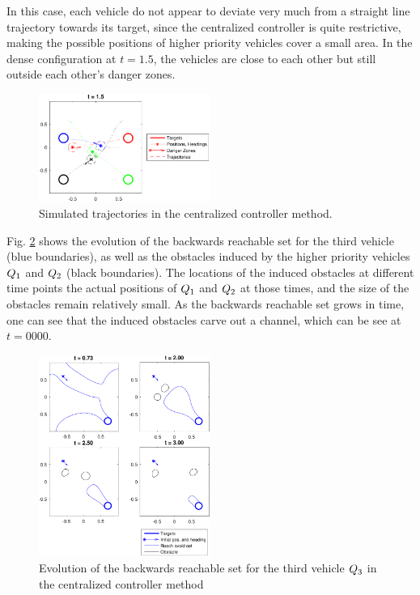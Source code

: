 In this case, each vehicle do not appear to deviate very much from a straight line trajectory towards its target, since the centralized controller is quite restrictive, making the possible positions of higher priority vehicles cover a small area. In the dense configuration at $t=1.5$, the vehicles are close to each other but still outside each other's danger zones.

\begin{figure}
  \centering
  \includegraphics[width=0.5\textwidth]{"fig/cc_traj"}
  \caption{Simulated trajectories in the centralized controller method.}
  \label{fig:cc_traj}
\end{figure}

Fig. \ref{fig:cc_rs3} shows the evolution of the backwards reachable set for the third vehicle (blue boundaries), as well as the obstacles induced by the higher priority vehicles $Q_1$ and $Q_2$ (black boundaries). The locations of the induced obstacles at different time points the actual positions of $Q_1$ and $Q_2$ at those times, and the size of the obstacles remain relatively small. As the backwards reachable set grows in time, one can see that the induced obstacles carve out a channel, which can be see at $t = 0000$.

\begin{figure}
  \centering
  \includegraphics[width=0.5\textwidth]{"fig/cc_rs3"}
  \caption{Evolution of the backwards reachable set for the third vehicle $Q_3$ in the centralized controller method}
  \label{fig:cc_rs3}
\end{figure}


